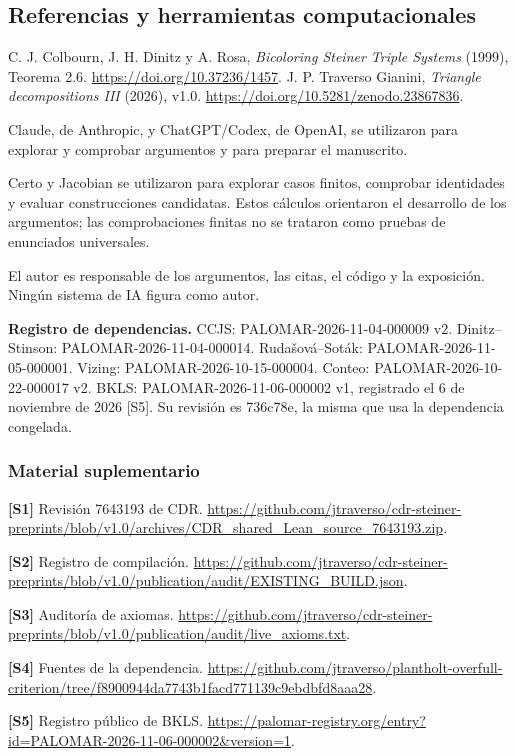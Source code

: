 \documentclass[spanish,11pt,a4paper]{article}
\begin{document}
\subsection{Referencias y herramientas computacionales}\label{referencias-y-herramientas-computacionales}

C. J. Colbourn, J. H. Dinitz y A. Rosa, \emph{Bicoloring Steiner Triple Systems} (1999), Teorema 2.6. \url{https://doi.org/10.37236/1457}. J. P. Traverso Gianini, \emph{Triangle decompositions III} (2026), v1.0. \url{https://doi.org/10.5281/zenodo.23867836}.

Claude, de Anthropic, y ChatGPT/Codex, de OpenAI, se utilizaron para explorar y comprobar argumentos y para preparar el manuscrito.

Certo y Jacobian se utilizaron para explorar casos finitos, comprobar identidades y evaluar construcciones candidatas. Estos cálculos orientaron el desarrollo de los argumentos; las comprobaciones finitas no se trataron como pruebas de enunciados universales.

El autor es responsable de los argumentos, las citas, el código y la exposición. Ningún sistema de IA figura como autor.

\textbf{Registro de dependencias.} CCJS: PALOMAR-2026-11-04-000009 v2. Dinitz--Stinson: PALOMAR-2026-11-04-000014. Rudašová--Soták: PALOMAR-2026-11-05-000001. Vizing: PALOMAR-2026-10-15-000004. Conteo: PALOMAR-2026-10-22-000017 v2. BKLS: PALOMAR-2026-11-06-000002 v1, registrado el 6 de noviembre de 2026 {[}S5{]}. Su revisión es 736c78e, la misma que usa la dependencia congelada.

\subsubsection{Material suplementario}\label{material-suplementario}

\textbf{{[}S1{]}} Revisión 7643193 de CDR. \url{https://github.com/jtraverso/cdr-steiner-preprints/blob/v1.0/archives/CDR_shared_Lean_source_7643193.zip}.

\textbf{{[}S2{]}} Registro de compilación. \url{https://github.com/jtraverso/cdr-steiner-preprints/blob/v1.0/publication/audit/EXISTING_BUILD.json}.

\textbf{{[}S3{]}} Auditoría de axiomas. \url{https://github.com/jtraverso/cdr-steiner-preprints/blob/v1.0/publication/audit/live_axioms.txt}.

\textbf{{[}S4{]}} Fuentes de la dependencia. \url{https://github.com/jtraverso/plantholt-overfull-criterion/tree/f8900944da7743b1facd771139c9ebdbfd8aaa28}.

\textbf{{[}S5{]}} Registro público de BKLS. \url{https://palomar-registry.org/entry?id=PALOMAR-2026-11-06-000002&version=1}.
\end{document}

